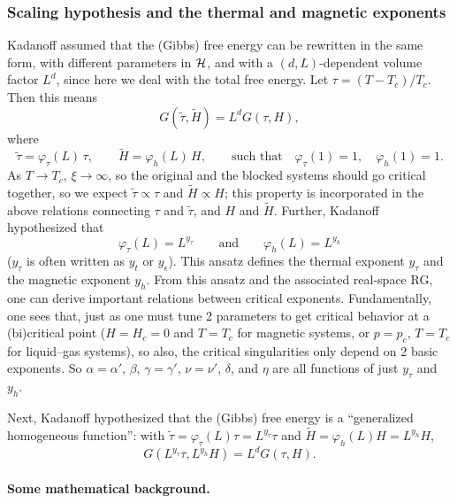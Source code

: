 \subsubsection*{Scaling hypothesis and the thermal and magnetic exponents}

Kadanoff assumed that the (Gibbs) free energy can be rewritten in the same form, with different
parameters in $\mathcal{H}$, and with a $(d,L)$-dependent volume factor $L^d$, since here we deal with the total
free energy. Let $\tau = (T-T_c)/T_c$. Then this means
\begin{equation}
  G(\tilde\tau,\tilde H) = L^dG(\tau,H),
\end{equation}
where
\begin{equation}
  \tilde\tau = \varphi_\tau(L)\,\tau,\qquad \tilde H = \varphi_h(L)\,H,
  \qquad\text{such that}\quad \varphi_\tau(1) = 1,\quad \varphi_h(1) = 1 .
\end{equation}
As $T\to T_c$, $\xi\to\infty$, so the original and the blocked systems should go critical together, so
we expect $\tilde\tau\propto\tau$ and $\tilde H\propto H$; this property is incorporated in the above
relations connecting $\tau$ and $\tilde\tau$, and $H$ and $\tilde H$. Further, Kadanoff hypothesized
that
\begin{equation}
  \varphi_\tau(L) = L^{y_\tau}\qquad\text{and}\qquad \varphi_h(L) = L^{y_h}
\end{equation}
($y_\tau$ is often written as $y_t$ or $y_\epsilon$). This ansatz defines the thermal exponent $y_\tau$
and the magnetic exponent $y_h$. From this ansatz and the associated real-space RG, one can derive
important relations between critical exponents. Fundamentally, one sees that, just as one must tune 2
parameters to get critical behavior at a (bi)critical point ($H = H_c = 0$ and $T = T_c$ for magnetic
systems, or $p = p_c$, $T = T_c$ for liquid--gas systems), so also, the critical singularities only
depend on 2 basic exponents. So $\alpha = \alpha'$, $\beta$, $\gamma = \gamma'$, $\nu = \nu'$, $\delta$,
and $\eta$ are all functions of just $y_\tau$ and $y_h$.

Next, Kadanoff hypothesized that the (Gibbs) free energy is a ``generalized homogeneous function'':
with $\tilde\tau = \varphi_\tau(L)\tau = L^{y_\tau}\tau$ and $\tilde H = \varphi_h(L)H = L^{y_h}H$,
\begin{equation}
  G(L^{y_\tau}\tau,L^{y_h}H) = L^dG(\tau,H).
\end{equation}

\paragraph{Some mathematical background.}

